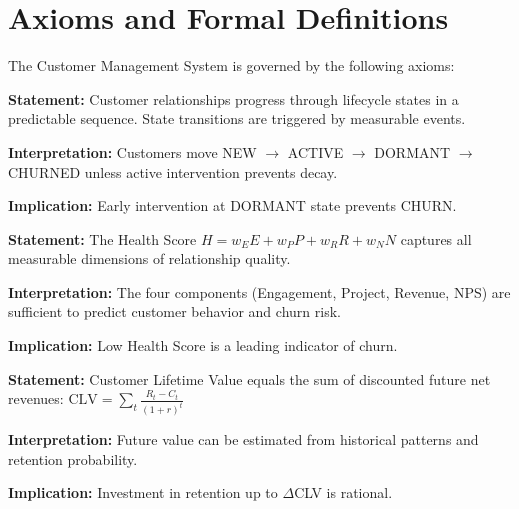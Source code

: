 \section{Axioms and Formal Definitions}
\label{sec:bp-axioms}

The Customer Management System is governed by the following axioms:

\begin{tcolorbox}[colback=gray!5!white, colframe=gray!75!black,
    title=Axiom BP-1: Lifecycle Monotonicity]
\textbf{Statement:} Customer relationships progress through lifecycle states
in a predictable sequence. State transitions are triggered by measurable events.

\textbf{Interpretation:} Customers move NEW $\rightarrow$ ACTIVE $\rightarrow$ DORMANT $\rightarrow$ CHURNED
unless active intervention prevents decay.

\textbf{Implication:} Early intervention at DORMANT state prevents CHURN.
\end{tcolorbox}

\begin{tcolorbox}[colback=gray!5!white, colframe=gray!75!black,
    title=Axiom BP-2: Health Score Completeness]
\textbf{Statement:} The Health Score $H = w_E E + w_P P + w_R R + w_N N$
captures all measurable dimensions of relationship quality.

\textbf{Interpretation:} The four components (Engagement, Project, Revenue, NPS)
are sufficient to predict customer behavior and churn risk.

\textbf{Implication:} Low Health Score is a leading indicator of churn.
\end{tcolorbox}

\begin{tcolorbox}[colback=gray!5!white, colframe=gray!75!black,
    title=Axiom BP-3: CLV Additivity]
\textbf{Statement:} Customer Lifetime Value equals the sum of discounted
future net revenues: $\text{CLV} = \sum_{t} \frac{R_t - C_t}{(1+r)^t}$

\textbf{Interpretation:} Future value can be estimated from historical patterns
and retention probability.

\textbf{Implication:} Investment in retention up to $\Delta$CLV is rational.
\end{tcolorbox}


